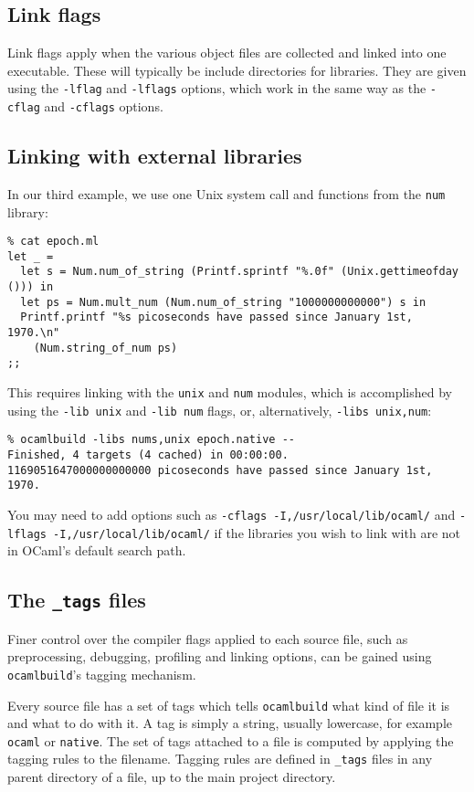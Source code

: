\documentclass[9pt]{article}
\newcommand{\ocb}{\texttt{ocamlbuild}\xspace}
\newcommand{\tags}{\texttt{\_tags}\xspace}
\begin{document}
\subsection{Link flags}
Link flags apply when the various object files are collected and linked into
one executable.  These will typically be include directories for libraries.
They are given using the \texttt{-lflag} and \texttt{-lflags} options, which
work in the same way as the \texttt{-cflag} and \texttt{-cflags} options.
\subsection{Linking with external libraries}
In our third example, we use one Unix system call and functions from the \texttt{num}
library:
\begin{verbatim}
% cat epoch.ml
let _ =
  let s = Num.num_of_string (Printf.sprintf "%.0f" (Unix.gettimeofday ())) in
  let ps = Num.mult_num (Num.num_of_string "1000000000000") s in
  Printf.printf "%s picoseconds have passed since January 1st, 1970.\n"
    (Num.string_of_num ps)
;;
\end{verbatim}
This requires linking with the \texttt{unix} and \texttt{num} modules, which is accomplished
by using the \texttt{-lib unix} and \texttt{-lib num} flags, or, alternatively, \texttt{-libs unix,num}:
\begin{verbatim}
% ocamlbuild -libs nums,unix epoch.native --
Finished, 4 targets (4 cached) in 00:00:00.
1169051647000000000000 picoseconds have passed since January 1st, 1970.
\end{verbatim}
You may need to add options such as \texttt{-cflags -I,/usr/local/lib/ocaml/}
and \texttt{-lflags -I,/usr/local/lib/ocaml/} if the libraries you wish to
link with are not in OCaml's default search path.
\subsection{The \tags files}
Finer control over the compiler flags applied to each source file, such as
preprocessing, debugging, profiling and linking options, can be gained using
\ocb's tagging mechanism.

Every source file has a set of tags which tells \ocb what kind of file it is
and what to do with it.  A tag is simply a string, usually lowercase, for
example \texttt{ocaml} or \texttt{native}.  The set of tags attached to a file
is computed by applying the tagging rules to the filename.  Tagging rules are
defined in \tags files in any parent directory of a file, up to the main
project directory.
\end{document}
